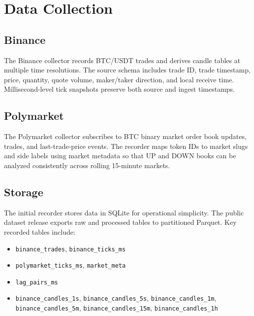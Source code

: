 \section{Data Collection}
\label{sec:data-collection}

\subsection{Binance}
\label{sec:data-binance}

The Binance collector records BTC/USDT trades and derives candle tables at
multiple time resolutions. The source schema includes trade ID, trade timestamp,
price, quantity, quote volume, maker/taker direction, and local receive time.
Millisecond-level tick snapshots preserve both source and ingest timestamps.

\subsection{Polymarket}
\label{sec:data-polymarket}

The Polymarket collector subscribes to BTC binary market order book updates,
trades, and last-trade-price events. The recorder maps token IDs to market slugs
and side labels using market metadata so that UP and DOWN books can be analyzed
consistently across rolling 15-minute markets.

\subsection{Storage}
\label{sec:data-storage}

The initial recorder stores data in SQLite for operational simplicity. The
public dataset release exports raw and processed tables to partitioned Parquet.
Key recorded tables include:
\begin{itemize}
  \item \texttt{binance\_trades}, \texttt{binance\_ticks\_ms}
  \item \texttt{polymarket\_ticks\_ms}, \texttt{market\_meta}
  \item \texttt{lag\_pairs\_ms}
  \item \texttt{binance\_candles\_1s}, \texttt{binance\_candles\_5s},
        \texttt{binance\_candles\_1m}, \texttt{binance\_candles\_5m},
        \texttt{binance\_candles\_15m}, \texttt{binance\_candles\_1h}
\end{itemize}